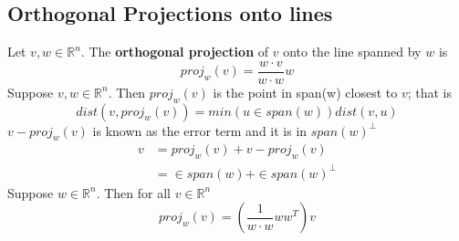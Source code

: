 \begin{enumerate}
\section{Orthogonal Projections onto lines}
Let $v, w \in \mathbb{R}^n$. The \textbf{orthogonal projection} of $v$ 
onto the line spanned by $w$ is 
\[
  proj_w(v) = \frac{w \cdot v}{w \cdot w}w 
\]
Suppose $v, w \in \mathbb{R}^n$. Then $proj_w(v)$ is the point in 
span(w) closest to $v$; that is 
\[
  dist(v, proj_w(v)) = min(u \in span(w)) dist(v, u)
\]
$v - proj_w(v)$ is known as the error term and it is in $span(w)^\perp$ 
\[
  \begin{aligned}
    v &= proj_w(v) + v - proj_w(v) \\
      &= \in span(w) + \in span(w)^\perp
  \end{aligned}
\]
Suppose $w \in \mathbb{R}^n$. Then for all $v \in \mathbb{R}^n$ 
\[
  proj_w(v) = (\frac{1}{w \cdot w}ww^T)v
\]

\end{enumerate}
